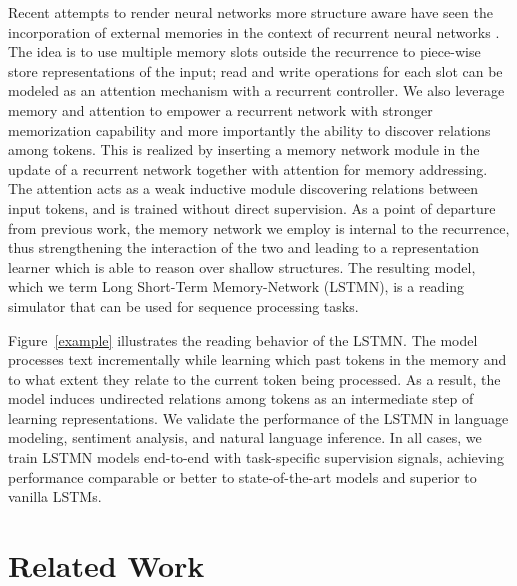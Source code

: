 \documentclass[11pt,letterpaper]{article}
\begin{document}
	
        Recent attempts to render neural networks more structure aware
        have seen the incorporation of external memories in the
        context of recurrent neural networks
        \cite{weston2014memory,sukhbaatar2015end,grefenstette2015learning}. The
        idea is to use multiple memory slots outside the recurrence to
        piece-wise store representations of the input; read and write
        operations for each slot can be modeled as an attention
        mechanism with a recurrent controller.  We also leverage
        memory and attention to empower a recurrent network with
        stronger memorization capability and more importantly the
        ability to discover relations among tokens.  This is realized
        by inserting a memory network module in the update of a
        recurrent network together with attention for memory
        addressing.  The attention acts as a weak inductive module
        discovering relations between input tokens, and is trained
        without direct supervision.  As a point of departure from
        previous work, the memory network we employ is internal to the
        recurrence, thus strengthening the interaction of the two and
        leading to a representation learner which is able to reason
        over shallow structures.  The resulting model, which we term
        Long Short-Term Memory-Network (LSTMN), is a reading simulator
        that can be used for sequence processing tasks.






	
	Figure~\ref{example} illustrates the reading behavior of the
        LSTMN.  The model processes text incrementally while learning
        which past tokens in the memory and to what extent they relate
        to the current token being processed. As a result, the model
        induces undirected relations among tokens as an intermediate
        step of learning representations.  We validate the performance
        of the LSTMN in language modeling, sentiment analysis, and
        natural language inference. In all cases, we train LSTMN
        models end-to-end with task-specific supervision signals,
        achieving performance comparable or better to state-of-the-art
        models and superior to vanilla LSTMs.
	
	\section{Related Work}
	\label{sec:related-work}
\end{document}
